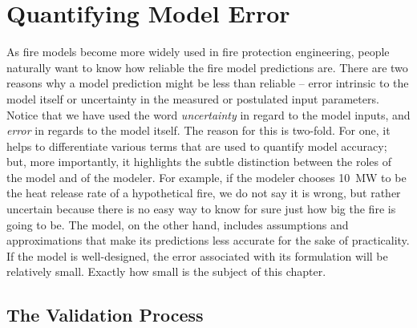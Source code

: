 
\chapter{Quantifying Model Error}

As fire models become more widely used in fire protection engineering, people naturally want to know how reliable the fire model predictions are.
There are two reasons why a model prediction might be less than reliable -- error intrinsic to the model itself or uncertainty in the measured or postulated input parameters.
Notice that we have used the word {\em uncertainty} in regard to the model inputs, and {\em error} in regards to the model itself. The reason for this is two-fold. For one,
it helps to differentiate various terms that are used to quantify model accuracy; but, more importantly, it highlights the subtle distinction between the roles of the model
and of the modeler. For example, if the modeler chooses 10~MW to be the heat release rate of a hypothetical fire, we do not say it is wrong, but rather uncertain because there
is no easy way to know for sure just how big the fire is going to be. The model, on the other hand, includes assumptions and approximations that make its predictions less
accurate for the sake of practicality. If the model is well-designed, the error associated with its formulation will be relatively small. Exactly how small is the subject of
this chapter.

\section{The Validation Process}

